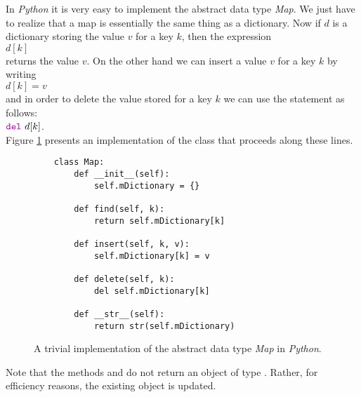 In \textsl{Python} it is very easy to implement the abstract data type  \textsl{Map}.  We just have
to realize that a map is essentially the same thing as a dictionary.
Now if $d$ is a dictionary storing the value $v$ for a key $k$, then the expression
\\[0.2cm]
\hspace*{1.3cm} $d[k]$
\\[0.2cm]
returns the value $v$.  On the other hand we can insert a value $v$ for a key $k$ by
writing
\\[0.2cm]
\hspace*{1.3cm}
$d[k] = v$ 
\\[0.2cm]
and in order to delete the value stored for a key  $k$ we can use the  statement
as follows: \\[0.2cm]
\hspace*{1.3cm} $\mytt{del}\ d[k]$. \\[0.2cm]
Figure  \ref{fig:Map-Trivial.ipynb} presents an implementation of the class  that proceeds along
these lines.


\begin{figure}[!ht]
  \centering
\begin{verbatim}
    class Map:
        def __init__(self):
            self.mDictionary = {}
        
        def find(self, k):
            return self.mDictionary[k]
        
        def insert(self, k, v):
            self.mDictionary[k] = v
            
        def delete(self, k):
            del self.mDictionary[k]
            
        def __str__(self):
            return str(self.mDictionary)
\end{verbatim}
\vspace*{-0.3cm}
  \caption{A trivial implementation of the abstract data type \textsl{Map} in \textsl{Python}.}
  \label{fig:Map-Trivial.ipynb}
\end{figure} 
Note that the methods  and  do not return an object of type .  Rather, for
efficiency reasons, the existing  object is updated.


